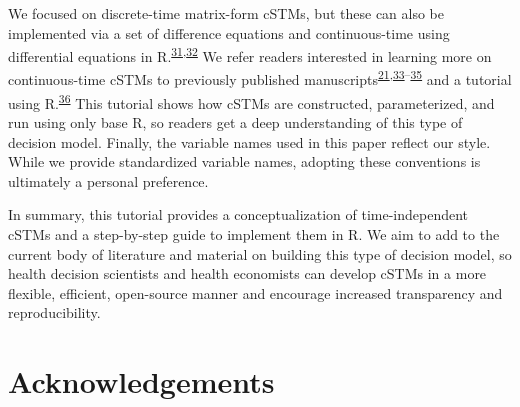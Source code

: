 \documentclass[
]{article}
\begin{document}
We focused on discrete-time matrix-form cSTMs, but these can also be implemented via a set of difference equations and continuous-time using differential equations in R.\textsuperscript{\protect\hyperlink{ref-Grimmett2014}{31},\protect\hyperlink{ref-Axler2005}{32}} We refer readers interested in learning more on continuous-time cSTMs to previously published manuscripts\textsuperscript{\protect\hyperlink{ref-VanRosmalen2013}{21},\protect\hyperlink{ref-Cao2016}{33}--\protect\hyperlink{ref-Soares2012}{35}} and a tutorial using R.\textsuperscript{\protect\hyperlink{ref-Frederix2013a}{36}} This tutorial shows how cSTMs are constructed, parameterized, and run using only base R, so readers get a deep understanding of this type of decision model. Finally, the variable names used in this paper reflect our style. While we provide standardized variable names, adopting these conventions is ultimately a personal preference.

In summary, this tutorial provides a conceptualization of time-independent cSTMs and a step-by-step guide to implement them in R. We aim to add to the current body of literature and material on building this type of decision model, so health decision scientists and health economists can develop cSTMs in a more flexible, efficient, open-source manner and encourage increased transparency and reproducibility.

\hypertarget{acknowledgements}{%
\section{Acknowledgements}\label{acknowledgements}}
\end{document}
